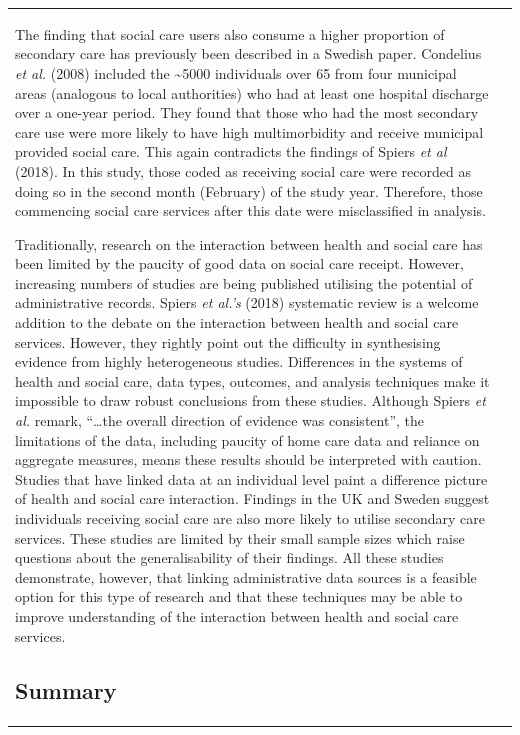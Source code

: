 \documentclass[12pt,a4paper,oneside,table]{report}
\begin{document}
\begin{tabular}[t]{ll}
The finding that social care users also consume a higher proportion of
secondary care has previously been described in a Swedish paper.
Condelius \textit{et al.} (2008) included the \textasciitilde5000
individuals over 65 from four municipal areas (analogous to local
authorities) who had at least one hospital discharge over a one-year
period. They found that those who had the most secondary care use were
more likely to have high multimorbidity and receive municipal provided
social care. This again contradicts the findings of Spiers \emph{et al}
(2018). In this study, those coded as receiving social care were
recorded as doing so in the second month (February) of the study year.
Therefore, those commencing social care services after this date were
misclassified in analysis.

Traditionally, research on the interaction between health and social
care has been limited by the paucity of good data on social care
receipt. However, increasing numbers of studies are being published
utilising the potential of administrative records. Spiers
\textit{et al.'s} (2018) systematic review is a welcome addition to the
debate on the interaction between health and social care services.
However, they rightly point out the difficulty in synthesising evidence
from highly heterogeneous studies. Differences in the systems of health
and social care, data types, outcomes, and analysis techniques make it
impossible to draw robust conclusions from these studies. Although
Spiers \textit{et al.} remark, ``\ldots the overall direction of
evidence was consistent'', the limitations of the data, including
paucity of home care data and reliance on aggregate measures, means
these results should be interpreted with caution. Studies that have
linked data at an individual level paint a difference picture of health
and social care interaction. Findings in the UK and Sweden suggest
individuals receiving social care are also more likely to utilise
secondary care services. These studies are limited by their small sample
sizes which raise questions about the generalisability of their
findings. All these studies demonstrate, however, that linking
administrative data sources is a feasible option for this type of
research and that these techniques may be able to improve understanding
of the interaction between health and social care services.

\subsection{Summary}\label{subsec:hsc-interaction-summary}


\end{tabular}
\end{document}
